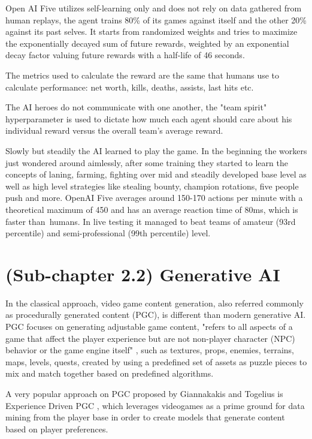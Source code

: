 \documentclass[a4paper,one side,12pt]{book}
\begin{document}
Open AI Five utilizes self-learning only and does not rely on data
gathered from human replays, the agent trains 80\% of its games against
itself and the other 20\% against its past selves. It starts from
randomized weights and tries to maximize the exponentially decayed sum
of future rewards, weighted by an exponential decay factor valuing
future rewards with a half-life of 46 seconds.

The metrics used to calculate the reward are the same that humans use to
calculate performance: net worth, kills, deaths, assists, last hits etc.

The AI heroes do not communicate with one another, the "team spirit"
hyperparameter is used to dictate how much each agent should care about
his individual reward versus the overall team's average reward.

Slowly but steadily the AI learned to play the game. In the beginning
the workers just wondered around aimlessly, after some training they
started to learn the concepts of laning, farming, fighting over mid and
steadily developed base level as well as high level strategies like
stealing bounty, champion rotations, five people push and more. OpenAI
Five averages around 150-170 actions per minute with a theoretical
maximum of 450 and has an average reaction time of 80ms, which is faster
than~humans. In live testing it managed to beat teams of amateur (93rd
percentile) and semi-professional (99th percentile) level.


\section{(Sub-chapter 2.2) Generative AI}

In the classical approach, video game content generation, also referred
commonly as procedurally generated content (PGC), is different than
modern generative AI. PGC focuses on generating adjustable game content,
"refers to all aspects of a game that affect the player experience but
are not non-player character (NPC) behavior or the game engine itself"\cite{yannakakis_2011_experiencedriven}
, such as textures, props, enemies, terrains, maps, levels,
quests, created by using a predefined set of assets as puzzle pieces to
mix and match together based on predefined algorithms.

A very popular approach on PGC proposed by Giannakakis and Togelius is
Experience Driven PGC \cite{yannakakis_2011_experiencedriven}, which leverages videogames as a prime ground for data mining from the player base in order to create models that generate content based on player preferences.
\end{document}
